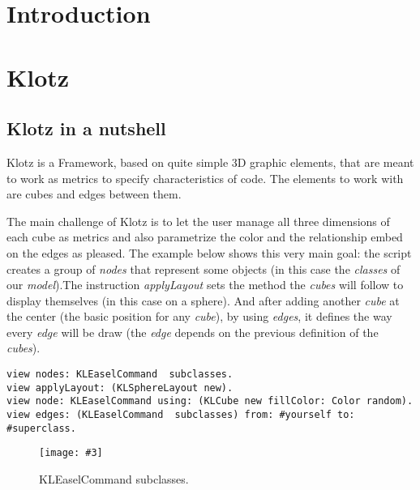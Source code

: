 \documentclass[runningheads]{llncs}
\newcommand{\seclabel}[1]{\label{sec:#1}}
\newcommand{\fig}[4]{
       \begin{figure}[#1]
               \centering
               \texttt{[image: \#3]}
               \caption{\label{fig:#3}#4}
       \end{figure}}
\begin{document}

\section{Introduction} \seclabel{introduction}


\section{Klotz} \seclabel{klotz}

\subsection{Klotz in a nutshell} \seclabel{nutshell}
Klotz is a Framework, based on quite simple 3D graphic elements,
that are meant to work as metrics to specify characteristics of
code. The elements to work with are cubes and edges between them.

The main challenge of Klotz is to let the user manage all three 
dimensions of each cube as metrics and also parametrize the color 
and the relationship embed on the edges as pleased. The example
below shows this very main goal: the script creates a group of
\emph{nodes} that represent some objects (in this case the 
\emph{classes} of our \emph{model}).The instruction \emph{applyLayout} 
sets the method the \emph{cubes} will follow to display themselves 
(in this case on a sphere). And after adding another \emph{cube} at the 
center (the basic position for any \emph{cube}), by using \emph{edges}, 
it defines the way every \emph{edge} will be draw (the \emph{edge} 
depends on the previous definition of the \emph{cubes}).

\begin{lstlisting}
view nodes: KLEaselCommand  subclasses.
view applyLayout: (KLSphereLayout new).
view node: KLEaselCommand using: (KLCube new fillColor: Color random).
view edges: (KLEaselCommand  subclasses) from: #yourself to: #superclass.   
\end{lstlisting}
\fig{}{0.5}{example.png}{KLEaselCommand subclasses.}
\end{document}
